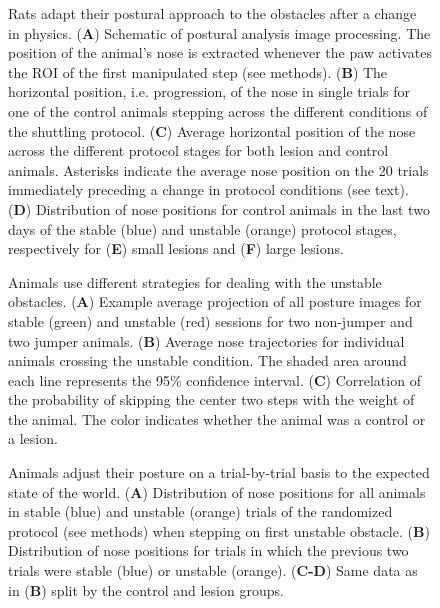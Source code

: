 \begin{figure}
\centering

\caption{Rats adapt their postural approach to the obstacles after a change in physics. (\textbf{A}) Schematic of postural analysis image processing. The position of the animal's nose is extracted whenever the paw activates the ROI of the first manipulated step (see methods). (\textbf{B}) The horizontal position, i.e. progression, of the nose in single trials for one of the control animals stepping across the different conditions of the shuttling protocol. (\textbf{C}) Average horizontal position of the nose across the different protocol stages for both lesion and control animals. Asterisks indicate the average nose position on the 20 trials immediately preceding a change in protocol conditions (see text). (\textbf{D}) Distribution of nose positions for control animals in the last two days of the stable (blue) and unstable (orange) protocol stages, respectively for (\textbf{E}) small lesions and (\textbf{F}) large lesions.}
\label{fig:posture}
\end{figure}

\begin{figure}
\centering

\caption{Animals use different strategies for dealing with the unstable obstacles. (\textbf{A}) Example average projection of all posture images for stable (green) and unstable (red) sessions for two non-jumper and two jumper animals. (\textbf{B}) Average nose trajectories for individual animals crossing the unstable condition. The shaded area around each line represents the 95\% confidence interval. (\textbf{C}) Correlation of the probability of skipping the center two steps with the weight of the animal. The color indicates whether the animal was a control or a lesion.}
\label{fig:jumping}
\end{figure}

\begin{figure}
\centering

\caption{Animals adjust their posture on a trial-by-trial basis to the expected state of the world. (\textbf{A}) Distribution of nose positions for all animals in stable (blue) and unstable (orange) trials of the randomized protocol (see methods) when stepping on first unstable obstacle. (\textbf{B}) Distribution of nose positions for trials in which the previous two trials were stable (blue) or unstable (orange). (\textbf{C-D}) Same data as in (\textbf{B}) split by the control and lesion groups.}
\label{fig:random}
\end{figure}

